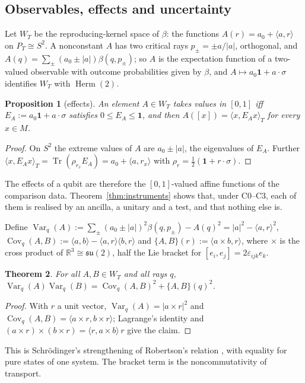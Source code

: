 \documentclass[aps,pra,onecolumn,superscriptaddress,nofootinbib,10pt]{revtex4-2}
\newtheorem{theorem}{Theorem}
\newtheorem{proposition}[theorem]{Proposition}
\theoremstyle{definition}
\theoremstyle{remark}
\newcommand{\R}{\mathbb{R}}
\newcommand{\su}{\mathfrak{su}}
\newcommand{\tr}{\operatorname{Tr}}
\newcommand{\Var}{\operatorname{Var}}
\newcommand{\Cov}{\operatorname{Cov}}
\newcommand{\Herm}{\operatorname{Herm}}
\newcommand{\ip}[2]{\langle #1,#2\rangle}
\begin{document}
\subsection{Observables, effects and uncertainty}
Let $W_T$ be the reproducing-kernel space of $\beta$: the functions $A(r)=a_0+\ip{a}{r}$ on
$P_T\cong S^2$.  A nonconstant $A$ has two critical rays $p_\pm=\pm a/\lvert a\rvert$, orthogonal, and
$A(q)=\sum_\pm(a_0\pm\lvert a\rvert)\beta(q,p_\pm)$; so $A$ is the expectation function of a two-valued
observable with outcome probabilities given by $\beta$, and $A\mapsto a_0\mathbf1+a\cdot\sigma$
identifies $W_T$ with $\Herm(2)$.

\begin{proposition}[effects]\label{prop:effects}
An element $A\in W_T$ takes values in $[0,1]$ iff $E_A:=a_0\mathbf1+a\cdot\sigma$ satisfies
$0\le E_A\le\mathbf1$, and then $A([x])=\ip{x}{E_Ax}_T$ for every $x\in M$.
\end{proposition}
\begin{proof}
On $S^2$ the extreme values of $A$ are $a_0\pm\lvert a\rvert$, the eigenvalues of $E_A$.  Further
$\ip{x}{E_Ax}_T=\tr(\rho_{r_x}E_A)=a_0+\ip{a}{r_x}$ with $\rho_r=\frac12(\mathbf1+r\cdot\sigma)$.
\end{proof}
The effects of a qubit are therefore the $[0,1]$-valued affine functions of the comparison data.
Theorem~\ref{thm:instruments} shows that, under C0--C3, each of them
is realised by an ancilla, a unitary and a test, and that nothing else is.

Define $\Var_q(A):=\sum_\pm(a_0\pm\lvert a\rvert)^2\beta(q,p_\pm)-A(q)^2=\lvert a\rvert^2-\ip{a}{r}^2$,
$\Cov_q(A,B):=\ip{a}{b}-\ip{a}{r}\ip{b}{r}$ and $\{A,B\}(r):=\ip{a\times b}{r}$, where $\times$ is the
cross product of $\R^3\cong\su(2)$, half the Lie bracket for $[e_i,e_j]=2\varepsilon_{ijk}e_k$.

\begin{theorem}\label{thm:unc}
For all $A,B\in W_T$ and all rays $q$, $\Var_q(A)\Var_q(B)=\Cov_q(A,B)^2+\{A,B\}(q)^2$.
\end{theorem}
\begin{proof}
With $r$ a unit vector, $\Var_q(A)=\lvert a\times r\rvert^2$ and $\Cov_q(A,B)=\ip{a\times r}{b\times r}$;
Lagrange's identity and $(a\times r)\times(b\times r)=\ip{r}{a\times b}\,r$ give the claim.
\end{proof}
This is Schr\"odinger's strengthening \cite{Schrodinger30} of Robertson's relation \cite{Robertson}, with
equality for pure states of one system.  The bracket term is the noncommutativity of transport.
\end{document}
